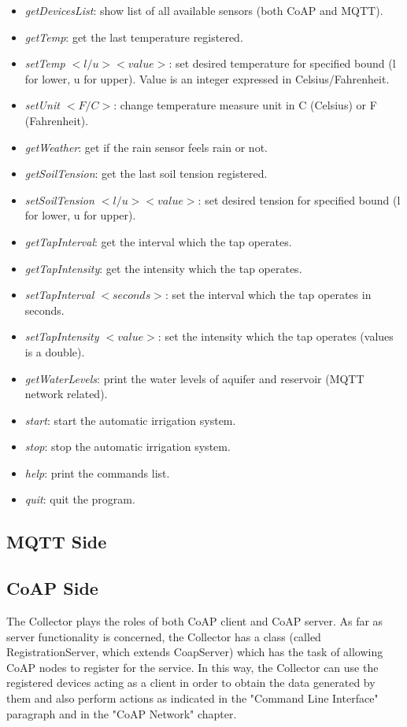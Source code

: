 \begin{itemize}
	\item \textit{getDevicesList}: show list of all available sensors (both CoAP and MQTT).
	\item \textit{getTemp}: get the last temperature registered.
	\item \textit{setTemp $<l/u> <value>$}: set desired temperature for specified bound (l for lower, u for upper). Value is an integer expressed in Celsius/Fahrenheit.
	\item \textit{setUnit $<F/C>$}: change temperature measure unit in C (Celsius) or F (Fahrenheit).
	\item \textit{getWeather}: get if the rain sensor feels rain or not.
	\item \textit{getSoilTension}: get the last soil tension registered.
	\item \textit{setSoilTension $<l/u> <value>$}: set desired tension for specified bound (l for lower, u for upper).
	\item \textit{getTapInterval}: get the interval which the tap operates.
	\item \textit{getTapIntensity}: get the intensity which the tap operates.
	\item \textit{setTapInterval $<seconds>$}: set the interval which the tap operates in seconds.
	\item \textit{setTapIntensity $<value>$}: set the intensity which the tap operates (values is a double).
	\item \textit{getWaterLevels}: print the water levels of aquifer and reservoir (MQTT network related).
	\item \textit{start}: start the automatic irrigation system. 
	\item \textit{stop}: stop the automatic irrigation system.
	\item \textit{help}: print the commands list.
	\item \textit{quit}: quit the program.
\end{itemize}




\subsection{MQTT Side}




\subsection{CoAP Side}
The Collector plays the roles of both CoAP client and CoAP server. As far as server functionality is concerned, the Collector has a class (called RegistrationServer, which extends CoapServer) which has the task of allowing CoAP nodes to register for the service. In this way, the Collector can use the registered devices acting as a client in order to obtain the data generated by them and also perform actions as indicated in the "Command Line Interface" paragraph and in the "CoAP Network" chapter.

